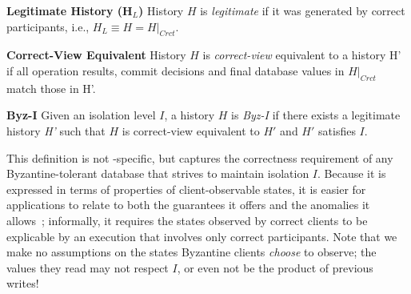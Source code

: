 \par\textbf{Legitimate History (H$_L$)} History $H$ is \textit{legitimate} if it was generated by correct participants, i.e., $H_L \equiv H = H|_{Crct}$.

\par\textbf{Correct-View Equivalent} History $H$ is \textit{correct-view} equivalent to a history H' if all operation results, commit decisions and final database values in  $H|_{Crct}$ match those in H'.



\par \textbf{Byz-I} Given  an isolation level $I$,
a history $H$ is \textit{Byz-I} if there exists a legitimate history \textit{H'} such that $H$ is correct-view equivalent to $H'$ and $H'$ satisfies $I$.


This definition is not \sys-specific, but captures the correctness requirement of any Byzantine-tolerant database that strives to maintain isolation $I$. Because it is  expressed in terms of properties of client-observable states, it is easier for applications to relate to both the guarantees it offers and the anomalies it allows~\cite{crooks17seeing}; informally, it requires the states observed by correct clients to be explicable by an execution that involves only correct participants.  Note that we make no assumptions on the states  Byzantine clients \textit{choose} to observe; the values they read may not respect $I$, or even not be the product of previous writes!


